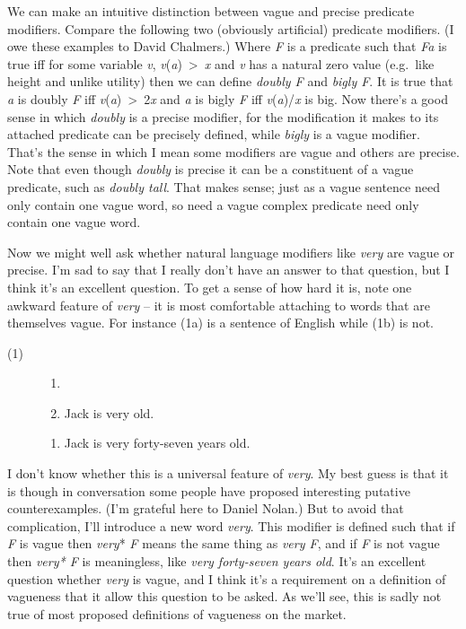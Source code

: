 \documentclass[
  10pt,
  letterpaper,
  DIV=11,
  numbers=noendperiod,
  twoside]{scrartcl}
\providecommand{\tightlist}{%
  \setlength{\itemsep}{0pt}\setlength{\parskip}{0pt}}\usepackage{longtable,booktabs,array}
\begin{document}
We can make an intuitive distinction between vague and precise predicate
modifiers. Compare the following two (obviously artificial) predicate
modifiers. (I owe these examples to David Chalmers.) Where \emph{F} is a
predicate such that \emph{Fa} is true iff for some variable \emph{v},
\emph{v}(\emph{a})~\textgreater~\emph{x} and \emph{v} has a natural zero
value (e.g.~like height and unlike utility) then we can define
\emph{doubly F} and \emph{bigly F}. It is true that \emph{a} is doubly
\emph{F} iff \emph{v}(\emph{a})~\textgreater~2\emph{x} and \emph{a} is
bigly \emph{F} iff \emph{v}(\emph{a})/\emph{x} is big. Now there's a
good sense in which \emph{doubly} is a precise modifier, for the
modification it makes to its attached predicate can be precisely
defined, while \emph{bigly} is a vague modifier. That's the sense in
which I mean some modifiers are vague and others are precise. Note that
even though \emph{doubly} is precise it can be a constituent of a vague
predicate, such as \emph{doubly tall}. That makes sense; just as a vague
sentence need only contain one vague word, so need a vague complex
predicate need only contain one vague word.

Now we might well ask whether natural language modifiers like
\emph{very} are vague or precise. I'm sad to say that I really don't
have an answer to that question, but I think it's an excellent question.
To get a sense of how hard it is, note one awkward feature of
\emph{very} -- it is most comfortable attaching to words that are
themselves vague. For instance (1a) is a sentence of English while (1b)
is not.

\begin{description}
\item[(1)]
\begin{enumerate}
\def\labelenumi{(\alph{enumi})}
\tightlist
\item[]
\item
  Jack is very old.
\end{enumerate}

\begin{enumerate}
\def\labelenumi{(\alph{enumi})}
\setcounter{enumi}{1}
\tightlist
\item
  Jack is very forty-seven years old.
\end{enumerate}
\end{description}

I don't know whether this is a universal feature of \emph{very}. My best
guess is that it is though in conversation some people have proposed
interesting putative counterexamples. (I'm grateful here to Daniel
Nolan.) But to avoid that complication, I'll introduce a new word
\emph{very}. This modifier is defined such that if \emph{F} is vague
then \emph{very}* \emph{F} means the same thing as \emph{very F}, and if
\emph{F} is not vague then \emph{very* F} is meaningless, like
\emph{very forty-seven years old}. It's an excellent question whether
\emph{very} is vague, and I think it's a requirement on a definition of
vagueness that it allow this question to be asked. As we'll see, this is
sadly not true of most proposed definitions of vagueness on the market.
\end{document}
